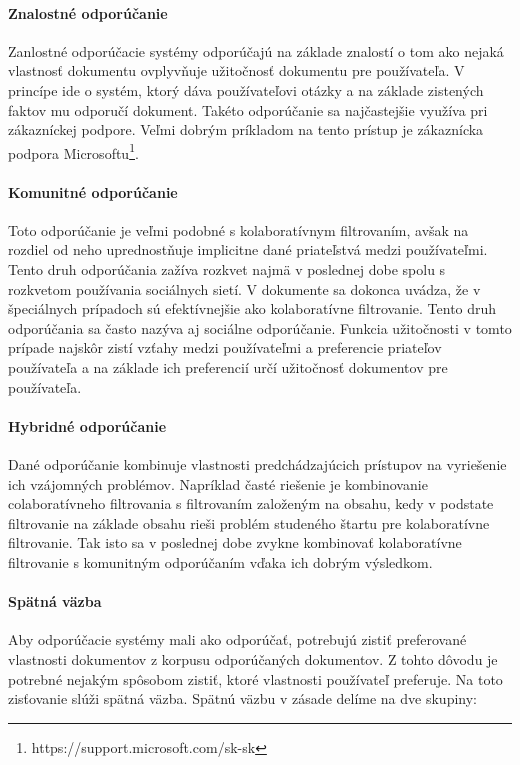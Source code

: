 \paragraph{Znalostné odporúčanie}

Zanlostné odporúčacie systémy odporúčajú na základe znalostí o tom ako nejaká vlastnosť 
dokumentu ovplyvňuje užitočnosť dokumentu pre používateľa. V princípe ide o systém,
ktorý dáva používateľovi otázky a na základe zistených faktov mu odporučí dokument.
Takéto odporúčanie sa najčastejšie využíva pri zákazníckej podpore. 
Veľmi dobrým príkladom na tento prístup je zákaznícka podpora
Microsoftu\footnote{https://support.microsoft.com/sk-sk}.

\paragraph{Komunitné odporúčanie}

Toto odporúčanie je veľmi podobné s kolaboratívnym filtrovaním, avšak na rozdiel od neho
uprednostňuje implicitne dané priateľstvá medzi používateľmi.  Tento druh odporúčania
zažíva rozkvet najmä v poslednej dobe spolu s rozkvetom používania sociálnych sietí.
V dokumente\cite{recommender_categories} sa dokonca uvádza, že v špeciálnych 
prípadoch sú efektívnejšie ako kolaboratívne filtrovanie.
Tento druh odporúčania sa často nazýva aj sociálne odporúčanie.
Funkcia užitočnosti v tomto prípade najskôr zistí vzťahy medzi používateľmi a 
preferencie priateľov používateľa a na základe ich preferencií určí užitočnosť dokumentov
pre používateľa.

\paragraph{Hybridné odporúčanie}

Dané odporúčanie kombinuje vlastnosti predchádzajúcich prístupov na vyriešenie ich vzájomných
problémov. Napríklad časté riešenie je kombinovanie colaboratívneho filtrovania s 
filtrovaním založeným na obsahu, kedy v podstate filtrovanie na základe obsahu rieši problém
studeného štartu pre kolaboratívne filtrovanie. Tak isto sa v poslednej dobe 
zvykne kombinovať kolaboratívne filtrovanie s komunitným odporúčaním
vďaka ich dobrým výsledkom.

\paragraph{Spätná väzba}

Aby odporúčacie systémy mali ako odporúčať, potrebujú zistiť preferované vlastnosti dokumentov
z korpusu odporúčaných dokumentov. Z tohto dôvodu je potrebné nejakým spôsobom zistiť, 
ktoré vlastnosti používateľ preferuje. Na toto zisťovanie slúži spätná väzba. 
Spätnú väzbu v zásade delíme na dve skupiny: 

